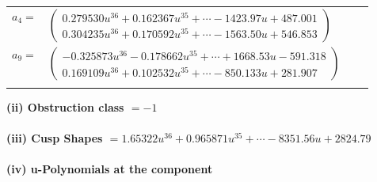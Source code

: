 \documentclass[1p]{elsarticle_modified}
\theoremstyle{definition}
\begin{document}
\begin{tabular}{m{7pt} m{180pt} m{7pt} m{180pt} }
\flushright $a_{4}=$&$\begin{pmatrix}0.279530 u^{36}+0.162367 u^{35}+\cdots-1423.97 u+487.001\\0.304235 u^{36}+0.170592 u^{35}+\cdots-1563.50 u+546.853\end{pmatrix}$ \\
\flushright $a_{9}=$&$\begin{pmatrix}-0.325873 u^{36}-0.178662 u^{35}+\cdots+1668.53 u-591.318\\0.169109 u^{36}+0.102532 u^{35}+\cdots-850.133 u+281.907\end{pmatrix}$\\&\end{tabular}
\flushleft \textbf{(ii) Obstruction class $= -1$}\\~\\
\flushleft \textbf{(iii) Cusp Shapes $= 1.65322 u^{36}+0.965871 u^{35}+\cdots-8351.56 u+2824.79$}\\~\\
\newpage\renewcommand{\arraystretch}{1}
\flushleft \textbf{(iv) u-Polynomials at the component}\newline \\
\end{document}
